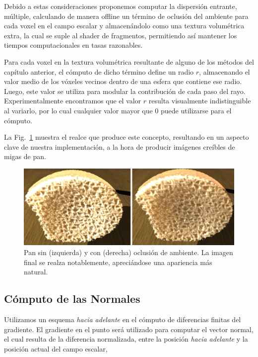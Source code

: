 Debido a estas consideraciones proponemos computar la dispersión entrante, múltiple, calculando de manera offline un término de oclusión del ambiente para cada voxel en el campo escalar y almacenándolo como una textura volumétrica extra, la cual se suple al shader de fragmentos, permitiendo así mantener los tiempos computacionales en tasas razonables.

Para cada voxel en la textura volumétrica resultante de alguno de los métodos del capítulo anterior, el cómputo de dicho término define un radio $r$, almacenando el valor medio de los vóxeles vecinos dentro de una esfera que contiene ese radio.
Luego, este valor se utiliza para modular la contribución de cada paso del rayo.
Experimentalmente encontramos que el valor $r$ resulta visualmente indistinguible al variarlo, por lo cual cualquier valor mayor que $0$ puede utilizarse para el cómputo.

La Fig.~\ref{fg:occlusion} muestra el realce que produce este concepto, resultando en un aspecto clave de nuestra implementación, a la hora de producir imágenes creíbles de migas de pan. 



\begin{figure}
\centerline{\includegraphics[width=13cm]{figures/occlusion}}
  \caption[Pan renderizado sin y con oclusión de ambiente]{Pan sin (izquierda) y con (derecha) oclusión de ambiente. La imagen final se realza notablemente, apreciándose una apariencia más natural.}
  \label{fg:occlusion}
\end{figure}
 
\subsection{Cómputo de las Normales}
Utilizamos un esquema {\em hacia adelante} en el cómputo de diferencias finitas del gradiente.
El gradiente en el punto será utilizado para computar el vector normal, el cual resulta de la diferencia normalizada, entre la posición {\em hacia adelante} y la posición actual del campo escalar,


